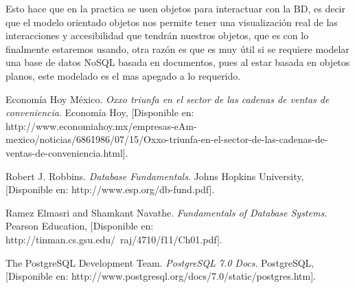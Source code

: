 \documentclass[spanish,12pt,letterpapper]{article}
\begin{document}
\begin{itemize}
    Esto hace que en la practica se usen objetos para interactuar con la BD, es decir que el modelo orientado objetos nos permite tener una visualización real de las interacciones y accesibilidad que tendrán nuestros objetos, que es con lo finalmente estaremos usando, otra razón es que es muy útil si se requiere modelar una base de datos NoSQL basada en documentos, pues al estar basada en objetos planos, este modelado es el mas apegado a lo requerido.\\

	\end{itemize}
	
	\pagebreak
	\begin{thebibliography}{9}
	 Economía Hoy México. 
		\emph{Oxxo triunfa en el sector de las cadenas de ventas de conveniencia}. Economía Hoy, [Disponible en: http://www.economiahoy.mx/empresas-eAm-mexico/noticias/6861986/07/15/Oxxo-triunfa-en-el-sector-de-las-cadenas-de-ventas-de-conveniencia.html].
		
		 Robert J. Robbins. 
		\emph{Database Fundamentals}. Johns Hopkins University, [Disponible en: http://www.esp.org/db-fund.pdf].
		
		 Ramez Elmasri and Shamkant Navathe. 
		\emph{Fundamentals of Database Systems}. Pearson Education, [Disponible en: http://tinman.cs.gsu.edu/~raj/4710/f11/Ch01.pdf].
		
		 The PostgreSQL Development Team. 
		\emph{PostgreSQL 7.0 Docs}. PostgreSQL, [Disponible en: http://www.postgresql.org/docs/7.0/static/postgres.htm].
		

	\end{thebibliography}
\end{document}
